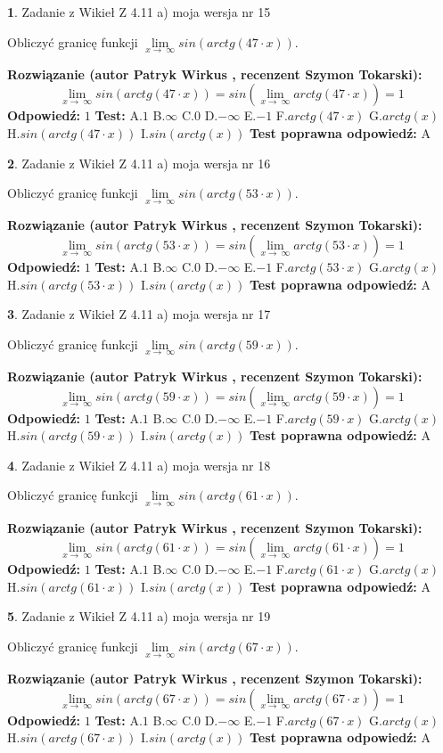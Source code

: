 \documentclass[12pt, a4paper]{article}
\theoremstyle{definition} %
\newtheorem{zad}{}
\newcommand{\zadStart}[1]{\begin{zad}#1\newline}
\newcommand{\zadStop}{\end{zad}}
\newcommand{\rozwStart}[2]{\noindent \textbf{Rozwiązanie (autor #1 , recenzent #2): }\newline}
\newcommand{\rozwStop}{\newline}
\newcommand{\odpStart}{\noindent \textbf{Odpowiedź:}\newline}
\newcommand{\odpStop}{\newline}
\newcommand{\testStart}{\noindent \textbf{Test:}\newline}
\newcommand{\testStop}{\newline}
\newcommand{\kluczStart}{\noindent \textbf{Test poprawna odpowiedź:}\newline}
\newcommand{\kluczStop}{\newline}
\begin{document}
\zadStart{Zadanie z Wikieł Z 4.11 a) moja wersja nr 15}

Obliczyć granicę funkcji  $\lim\limits_{x\to\ \infty}sin(arctg(47\cdot x))$.
\zadStop
\rozwStart{Patryk Wirkus}{Szymon Tokarski}
$$\lim\limits_{x\to\ \infty}sin(arctg(47\cdot x)) = sin(\lim\limits_{x\to\ \infty}arctg(47\cdot x)) = 1$$
\rozwStop
\odpStart
$1$
\odpStop
\testStart
A.$1$ B.$\infty$ C.$0$ D.$-\infty$ E.$-1$
F.$arctg(47\cdot x)$ G.$arctg(x)$
H.$sin(arctg(47\cdot x))$
I.$sin(arctg(x))$
\testStop
\kluczStart
A
\kluczStop



\zadStart{Zadanie z Wikieł Z 4.11 a) moja wersja nr 16}

Obliczyć granicę funkcji  $\lim\limits_{x\to\ \infty}sin(arctg(53\cdot x))$.
\zadStop
\rozwStart{Patryk Wirkus}{Szymon Tokarski}
$$\lim\limits_{x\to\ \infty}sin(arctg(53\cdot x)) = sin(\lim\limits_{x\to\ \infty}arctg(53\cdot x)) = 1$$
\rozwStop
\odpStart
$1$
\odpStop
\testStart
A.$1$ B.$\infty$ C.$0$ D.$-\infty$ E.$-1$
F.$arctg(53\cdot x)$ G.$arctg(x)$
H.$sin(arctg(53\cdot x))$
I.$sin(arctg(x))$
\testStop
\kluczStart
A
\kluczStop



\zadStart{Zadanie z Wikieł Z 4.11 a) moja wersja nr 17}

Obliczyć granicę funkcji  $\lim\limits_{x\to\ \infty}sin(arctg(59\cdot x))$.
\zadStop
\rozwStart{Patryk Wirkus}{Szymon Tokarski}
$$\lim\limits_{x\to\ \infty}sin(arctg(59\cdot x)) = sin(\lim\limits_{x\to\ \infty}arctg(59\cdot x)) = 1$$
\rozwStop
\odpStart
$1$
\odpStop
\testStart
A.$1$ B.$\infty$ C.$0$ D.$-\infty$ E.$-1$
F.$arctg(59\cdot x)$ G.$arctg(x)$
H.$sin(arctg(59\cdot x))$
I.$sin(arctg(x))$
\testStop
\kluczStart
A
\kluczStop



\zadStart{Zadanie z Wikieł Z 4.11 a) moja wersja nr 18}

Obliczyć granicę funkcji  $\lim\limits_{x\to\ \infty}sin(arctg(61\cdot x))$.
\zadStop
\rozwStart{Patryk Wirkus}{Szymon Tokarski}
$$\lim\limits_{x\to\ \infty}sin(arctg(61\cdot x)) = sin(\lim\limits_{x\to\ \infty}arctg(61\cdot x)) = 1$$
\rozwStop
\odpStart
$1$
\odpStop
\testStart
A.$1$ B.$\infty$ C.$0$ D.$-\infty$ E.$-1$
F.$arctg(61\cdot x)$ G.$arctg(x)$
H.$sin(arctg(61\cdot x))$
I.$sin(arctg(x))$
\testStop
\kluczStart
A
\kluczStop



\zadStart{Zadanie z Wikieł Z 4.11 a) moja wersja nr 19}

Obliczyć granicę funkcji  $\lim\limits_{x\to\ \infty}sin(arctg(67\cdot x))$.
\zadStop
\rozwStart{Patryk Wirkus}{Szymon Tokarski}
$$\lim\limits_{x\to\ \infty}sin(arctg(67\cdot x)) = sin(\lim\limits_{x\to\ \infty}arctg(67\cdot x)) = 1$$
\rozwStop
\odpStart
$1$
\odpStop
\testStart
A.$1$ B.$\infty$ C.$0$ D.$-\infty$ E.$-1$
F.$arctg(67\cdot x)$ G.$arctg(x)$
H.$sin(arctg(67\cdot x))$
I.$sin(arctg(x))$
\testStop
\kluczStart
A
\kluczStop
\end{document}
